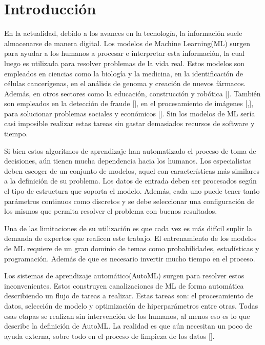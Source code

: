 \chapter*{Introducción}\label{chapter:introduction}
En la actualidad, debido a los avances en la tecnología, la información suele almacenarse de manera digital. Los modelos de Machine Learning(ML) surgen para 
ayudar a los humanos a procesar e interpretar esta información, la cual luego es utilizada para resolver problemas de la vida real. Estos modelos 
son empleados en ciencias como la biología y la medicina, en la identificación de células cancerígenas, en el análisis de genoma y creación de nuevos fármacos. 
Además, en otros sectores como la educación, construcción y robótica [\cite{39}]. También son empleados en la detección de fraude [\cite{4}], en el procesamiento de 
imágenes [\cite{1},\cite{3}], para solucionar problemas sociales y económicos [\cite{2}]. Sin los modelos de ML sería casi imposible realizar estas tareas sin 
gastar demasiados recursos de software y tiempo.

Si bien estos algoritmos de aprendizaje han automatizado el proceso de toma de decisiones, aún tienen mucha dependencia hacia los humanos. 
Los especialistas deben escoger de un conjunto de modelos, aquel con características más similares a la definición de su problema. Los datos de entrada 
deben ser procesados según el tipo de estructura que soporta el modelo. Además, cada uno puede tener tanto parámetros continuos como discretos y se debe seleccionar 
una configuración de los mismos que permita resolver el problema con buenos resultados.

Una de las limitaciones de su utilización es que cada vez es más difícil suplir la demanda de expertos que realicen este trabajo. El entrenamiento de los modelos de 
ML requiere de un gran dominio de temas como probabilidades, estadísticas y programación. Además de que es necesario invertir mucho tiempo en el proceso.

Los sistemas de aprendizaje automático(AutoML) surgen para resolver estos inconvenientes. Estos construyen canalizaciones de ML de forma automática describiendo un 
flujo de tareas a realizar. Estas tareas son: el procesamiento de datos, selección de modelo y optimización de hiperparámetros entre otras. Todas esas etapas se 
realizan sin intervención de los humanos, al menos eso es lo que describe la definición de AutoML. La realidad es que aún necesitan un poco de ayuda externa, sobre 
todo en el proceso de limpieza de los datos [\cite{36}].

